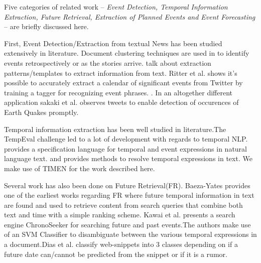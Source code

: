 Five categories of related work -- \emph{Event Detection, Temporal Information Extraction, Future Retrieval, Extraction of Planned Events and Event Forecasting} -- are briefly discussed here.

First, Event Detection/Extraction from textual News has been studied extensively in literature. Document clustering techniques are used in \cite{Allan:2002:TDT, Yang:1998:SRO, Gabrilovich:2004:NPP} to identify events retrospectively or as the stories arrive.\cite{Chambers:2011:TIE, Banko07openinformation, riloff2003learning} talk about extraction patterns/templates to extract information from text. Ritter et al.\cite{Ritter:2012} shows it's possible to accurately extract a calendar of significant events from Twitter by training a tagger for recognizing event phrases.
\iffalse Sankaranarayanan et al.\cite{Sankaranarayanan:2009:TNT} captures tweet clusters of interest to identify late breaking News from twitter \fi.
In an altogether different application sakaki et al.\cite{Sakaki:2010:EST} observes tweets to enable detection of occurences of Earth Quakes promptly.

Temporal information extraction has been well studied in literature.The TempEval challenge\cite{tempeval} led to a lot of development with regards to temporal NLP.\cite{timeml} provides a specification language for temporal and event expressions in natural language text.
\cite{LlorensDGS12} and \cite{tempex} provides methods to resolve temporal expressions in text. We make use of TIMEN \cite{LlorensDGS12} for the work described here.

Several work has also been done on Future Retrieval(FR). Baeza-Yates\cite{baeza2005searching} provides one of the earliest works regarding FR where future temporal information in text are found and used to retrieve content from search queries that combine both text and time with a simple ranking scheme. Kawai et al.\cite{Kawai:2010:CSE} presents a search engine ChronoSeeker for searching future and past events.The authors make use of an SVM Classifier to disambiguate between the various temporal expressions in a document.Dias et al.\cite{dias2011future} classify web-snippets into 3 classes depending on if a future date can/cannot be predicted from the snippet or if it is a rumor.


